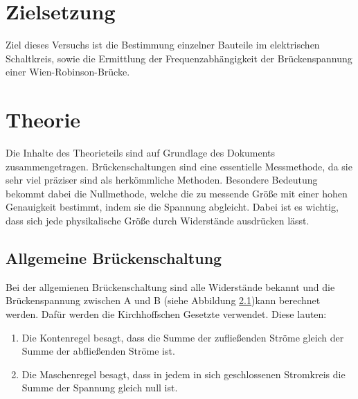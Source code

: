     \section{Zielsetzung}
    Ziel dieses Versuchs ist die Bestimmung einzelner Bauteile im elektrischen Schaltkreis,
    sowie die Ermittlung der Frequenzabhängigkeit der Brückenspannung einer Wien-Robinson-Brücke.

\section{Theorie}
\label{sec:Theorie}
Die Inhalte des Theorieteils sind auf Grundlage des Dokuments \cite{V302_Anleitung} zusammengetragen.
Brückenschaltungen sind eine essentielle Messmethode, da sie sehr viel präziser sind als herkömmliche Methoden.
Besondere Bedeutung bekommt dabei die Nullmethode, welche die zu messende Größe mit einer hohen Genauigkeit bestimmt,
indem sie die Spannung abgleicht.
Dabei ist es wichtig, dass sich jede physikalische Größe durch Widerstände ausdrücken lässt.
\subsection{Allgemeine Brückenschaltung}
Bei der allgemienen Brückenschaltung sind alle Widerstände bekannt und die Brückenspannung zwischen A und B (siehe
Abbildung \ref{})kann berechnet werden.
Dafür werden die Kirchhoffschen Gesetzte verwendet.
Diese lauten:
\begin{enumerate}
    \item Die Kontenregel besagt, dass die Summe der zufließenden Ströme gleich der Summe der abfließenden Ströme ist.
    \item Die Maschenregel besagt, dass in jedem in sich geschlossenen Stromkreis die Summe der Spannung gleich null ist.
\end{enumerate}



